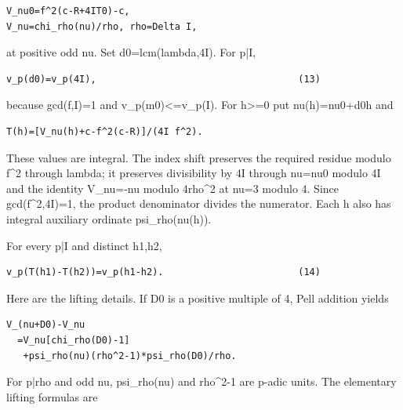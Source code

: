 \begin{verbatim}
V_nu0=f^2(c-R+4IT0)-c,
V_nu=chi_rho(nu)/rho, rho=Delta I,
\end{verbatim}

at positive odd nu. Set d0=\allowbreak{}lcm(lambda,4I). For p|I,



\begin{verbatim}
v_p(d0)=v_p(4I),                                    (13)
\end{verbatim}

because gcd(f,I)=\allowbreak{}1 and v\_\allowbreak{}p(m0)\textless{}\allowbreak{}=\allowbreak{}v\_\allowbreak{}p(I). For h\textgreater{}\allowbreak{}=\allowbreak{}0 put nu(h)=\allowbreak{}nu0+\allowbreak{}d0\textasteriskcentered{}\allowbreak{}h and



\begin{verbatim}
T(h)=[V_nu(h)+c-f^2(c-R)]/(4I f^2).
\end{verbatim}

These values are integral. The index shift preserves the required residue modulo f\textasciicircum{}\allowbreak{}2 through lambda; it preserves divisibility by 4I through nu=\allowbreak{}nu0 modulo 4I and the identity V\_\allowbreak{}nu=\allowbreak{}-nu modulo 4rho\textasciicircum{}\allowbreak{}2 at nu=\allowbreak{}3 modulo 4. Since gcd(f\textasciicircum{}\allowbreak{}2,4I)=\allowbreak{}1, the product denominator divides the numerator. Each h also has integral auxiliary ordinate psi\_\allowbreak{}rho(nu(h)).



For every p|I and distinct h1,h2,



\begin{verbatim}
v_p(T(h1)-T(h2))=v_p(h1-h2).                        (14)
\end{verbatim}

Here are the lifting details. If D0 is a positive multiple of 4, Pell addition yields



\begin{verbatim}
V_(nu+D0)-V_nu
  =V_nu[chi_rho(D0)-1]
   +psi_rho(nu)(rho^2-1)*psi_rho(D0)/rho.
\end{verbatim}

For p|rho and odd nu, psi\_\allowbreak{}rho(nu) and rho\textasciicircum{}\allowbreak{}2-1 are p-adic units. The elementary lifting formulas are



